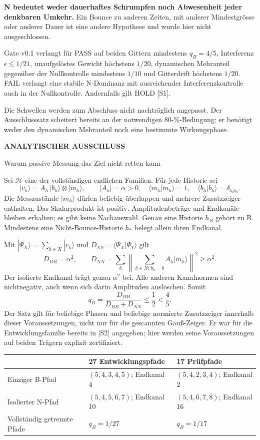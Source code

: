 \documentclass[11pt,a4paper]{article}
\newcommand{\kicker}[1]{{\sffamily\bfseries\small\color{teal}#1}\par}
\newcommand{\tit}[1]{{\sffamily\bfseries\LARGE\raggedright #1\par}\vspace{3pt}}
\newcommand{\sect}[1]{\par\vspace{3pt}{\sffamily\bfseries\large #1}\par}
\begin{document}
\textbf{N bedeutet weder dauerhaftes Schrumpfen noch Abwesenheit jeder denkbaren Umkehr.} Ein Bounce zu anderen Zeiten, mit anderer Mindestgrösse oder anderer Dauer ist eine andere Hypothese und wurde hier nicht ausgeschlossen.

\sect{Unveränderte Entscheidungsregel}
Gate v0.1 verlangt für PASS auf beiden Gittern mindestens $q_B=4/5$, Interferenz $\epsilon\le1/21$, unaufgelöstes Gewicht höchstens $1/20$, dynamischen Mehranteil gegenüber der Nullkontrolle mindestens $1/10$ und Gitterdrift höchstens $1/20$. FAIL verlangt eine stabile N-Dominanz mit ausreichender Interferenzkontrolle auch in der Nullkontrolle. Andernfalls gilt HOLD [S1].

Die Schwellen werden zum Abschluss nicht nachträglich angepasst. Der Ausschlusssatz scheitert bereits an der notwendigen 80-\%-Bedingung; er benötigt weder den dynamischen Mehranteil noch eine bestimmte Wirkungsphase.

\newpage
\kicker{ANALYTISCHER AUSSCHLUSS}
\tit{Warum passive Messung das Ziel nicht retten kann}
\sect{Voraussetzungen und Beweis}
Sei $\mathcal H$ eine der vollständigen endlichen Familien. Für jede Historie sei
\[
 |v_h\rangle=A_h\,|b_h\rangle\otimes|m_h\rangle,\qquad
 |A_h|=\alpha>0,\quad \langle m_h|m_h\rangle=1,
 \quad\langle b_h|b_k\rangle=\delta_{b_hb_k}.
\]
Die Messzustände $|m_h\rangle$ dürfen beliebig überlappen und mehrere Zusatzzeiger enthalten. Das Skalarprodukt ist positiv. Amplitudenbeträge und Endkanäle bleiben erhalten; es gibt keine Nachauswahl. Genau eine Historie $h_B$ gehört zu B. Mindestens eine Nicht-Bounce-Historie $h_*$ belegt allein ihren Endkanal.

Mit $|\Psi_X\rangle=\sum_{h\in X}|v_h\rangle$ und $D_{XY}=\langle\Psi_X|\Psi_Y\rangle$ gilt
\[
 D_{BB}=\alpha^2,\qquad
 D_{NN}=\sum_b\left\|\sum_{h\in N:\,b_h=b}A_h|m_h\rangle\right\|^2
 \ge \alpha^2.
\]
Der isolierte Endkanal trägt genau $\alpha^2$ bei. Alle anderen Kanalnormen sind nichtnegativ, auch wenn sich darin Amplituden auslöschen. Somit
\[
 \boxed{\quad q_B=\frac{D_{BB}}{D_{BB}+D_{NN}}\le\frac12<\frac45.\quad}
\]
Der Satz gilt für beliebige Phasen und beliebige normierte Zusatzzeiger innerhalb dieser Voraussetzungen, nicht nur für die gescannten Gauß-Zeiger. Er war für die Entwicklungsfamilie bereits in [S2] angegeben; hier werden seine Voraussetzungen auf beiden Trägern explizit zertifiziert.

\sect{Konkrete Zeugen im archivierten Träger}
\par\begin{tabularx}{\linewidth}{@{}p{37mm}Y Y@{}}\toprule
 & \textbf{27 Entwicklungspfade} & \textbf{17 Prüfpfade}\\\midrule
Einziger B-Pfad & $(5,4,3,4,5)$; Endkanal 4 & $(5,4,2,3,4)$; Endkanal 2\\
Isolierter N-Pfad & $(5,4,5,6,7)$; Endkanal 10 & $(5,4,6,7,8)$; Endkanal 16\\
Vollständig getrennte Pfade & $q_B=1/27$ & $q_B=1/17$\\\bottomrule
\end{tabularx}\par\vspace{3pt}
\end{document}
